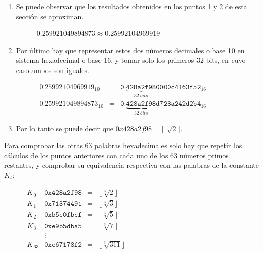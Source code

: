 \documentclass{article}
\begin{document}
\begin{enumerate}
            \item Se puede observar que los resultados obtenidos en los puntos 1 y 2 de esta sección se aproximan.
                \begin{figure}[H]
                \centering
                    $0.259921049894873 \approx 0.25992104969919$
                \end{figure}
            
            \item Por último hay que representar estos dos números decimales o base 10 en sistema hexadecimal o base 16, y tomar solo los primeros 32 bits, en cuyo caso ambos son iguales.
                \begin{figure}[H]
                \centering
                    $\begin{array}{lcl}
                    0.25992104969919_{10} & = & \texttt{0.}\underbrace{\texttt{428a2f98}}_{32 \ bits}\texttt{0000c4163f52}_{16} \\
                    0.259921049894873_{10} & = & \texttt{0.}\underbrace{\texttt{428a2f98}}_{32 \ bits}\texttt{d728a242d2b4}_{16}
                    \end{array}$
                \end{figure}
            
            \item Por lo tanto se puede decir que $0x428a2f98 = \lfloor \sqrt[3]{2} \rfloor$.
        \end{enumerate}
        
        Para comprobar las otras 63 palabras hexadecimales solo hay que repetir los cálculos de los puntos anteriores con cada uno de los 63 números primos restantes, y comprobar su equivalencia respectiva con las palabras de la constante $K_{t}$:
            \begin{figure}[H]
            \centering
                $\begin{array}{lccl}
                    K_{0} & \texttt{0x428a2f98} & = & \lfloor \sqrt[3]{2} \rfloor \\
                        K_{1} & \texttt{0x71374491} & = & \lfloor \sqrt[3]{3} \rfloor \\
                    K_{2} & \texttt{0xb5c0fbcf} & = & \lfloor \sqrt[3]{5} \rfloor \\
                    K_{3} & \texttt{0xe9b5dba5} & = & \lfloor \sqrt[3]{7} \rfloor \\
                    & \vdots & \\
                    K_{63} & \texttt{0xc67178f2} & = & \lfloor \sqrt[3]{311} \rfloor
                \end{array}$
            \end{figure}
\end{document}
